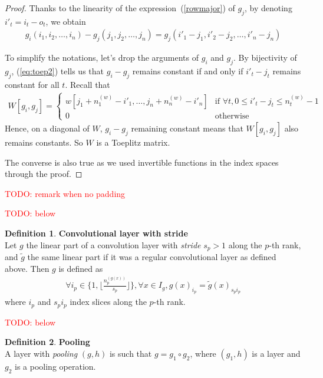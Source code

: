 \documentclass{article}
\theoremstyle{definition}
\newtheorem{definition}{Definition}[section]
\theoremstyle{remark}
\theoremstyle{plain}
\newcommand{\todo}[1]{\textcolor{red}{TODO: #1\\}}
\begin{document}
\begin{proof}
Thanks to the linearity of the expression~(\ref{rowmajor}) of $g_j$, by denoting $i'_t = i_t - o_t$, we obtain
\begin{gather}
  g_i(i_1, i_2, \ldots, i_n) - g_j(j_1, j_2, \ldots, j_n) = g_j(i'_1 - j_1, i'_2 - j_2, \ldots, i'_n - j_n)
\label{eq:toep2}
\end{gather}

To simplify the notations, let's drop the arguments of $g_i$ and $g_j$. By bijectivity of $g_j$, (\ref{eq:toep2}) tells us that $g_i - g_j$ remains constant if and only if $i'_t - j_t$ remains constant for all $t$. Recall that 
\begin{gather}
  W[g_i,g_j] =
 \begin{cases}
   w[j_1 + n_1^{(w)} - i'_1, \ldots, j_n + n_n^{(w)} - i'_n] & \text{if } \forall t, 0 \le i'_t - j_t \le n_t^{(w)} - 1 \\
   0 & \text{otherwise}
 \end{cases}
\label{eq:toep3}
\end{gather}
Hence, on a diagonal of $W$, $g_i - g_j$ remaining constant means that $W[g_i,g_j]$ also remains constants. So $W$ is a Toeplitz matrix.

The converse is also true as we used invertible functions in the index spaces through the proof.
\end{proof}

\todo{remark when no padding}

\todo{below}

\begin{definition}\textbf{Convolutional layer with stride}\\
Let $g$ the linear part of a convolution layer with \emph{stride} $s_p > 1$ along the $p$-th rank, and $\widetilde{g}$ the same linear part if it was a regular convolutional layer as defined above. Then $g$ is defined as
\begin{gather*}
  \forall i_p \in \{ 1, \lfloor \frac{n_p^{(g(x))}}{s_p} \rfloor \}, \forall x \in I_g, g(x)_{i_p} = \widetilde{g}(x)_{s_p i_p}
\end{gather*}
where $i_p$ and $s_p i_p$ index slices along the $p$-th rank.
\end{definition}

\todo{below}

\begin{definition}\textbf{Pooling}\\
A layer with \textit{pooling} $(g,h)$ is such that $g = g_1 \circ g_2$, where $(g_1,h)$ is a layer and $g_2$ is a pooling operation.

\end{definition}
\end{document}
